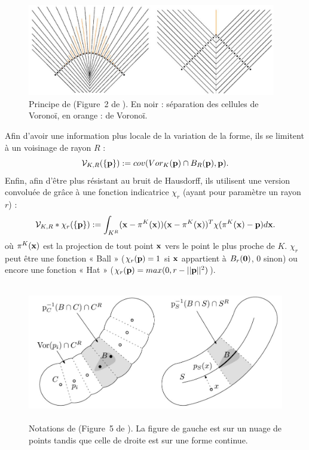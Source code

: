 \begin{figure}[ht]{
    \begin{center}
    \includegraphics[height=4cm]{images/Feature/VCM}
    \end{center}}
    \caption[Principe de \VCM.]{Principe de \VCM (Figure~2 de \cite{Merigot2011}). En noir : séparation des cellules de Voronoï, en orange :  de Voronoï.
      \label{fig:mellado-VCM}}
\end{figure}

Afin d'avoir une information plus locale de la variation de la forme, ils se
limitent à un voisinage de rayon $R$ :
%
\begin{equation}
  \mathcal{V}_{K,R}(\{\mathbf{p}\}) := cov(Vor_K(\mathbf{p}) \cap B_{R}(\mathbf{p}), \mathbf{p}) .
\end{equation}
%
Enfin, afin d'être plus résistant au bruit de Hausdorff, ils utilisent une
version convoluée de \VCM grâce à une fonction indicatrice $\chi_r$
(ayant pour paramètre un rayon $r$) :
%
\begin{equation}
  \mathcal{V}_{K,R} \ast \chi_r(\{\mathbf{p}\}) := \int_{K^R} (\mathbf{x} - \pi^K(\mathbf{x}))(\mathbf{x} - \pi^K(\mathbf{x}))^T \chi(\pi^K(\mathbf{x}) - \mathbf{p}) d\mathbf{x} .
\end{equation}
%
où $\pi^K(\mathbf{x})$ est la projection de tout point $\mathbf{x}$ vers le point le plus proche de
$K$. $\chi_r$ peut être une fonction « Ball » ($\chi_r(\mathbf{p}) = 1$ si $\mathbf{x}$
appartient à $B_{r}(\mathbf{0})$, $0$ sinon) ou encore une fonction « Hat »
($\chi_r(\mathbf{p}) = max(0, r - ||\mathbf{p}||^2)$).

\begin{figure}[ht]{
    \begin{center}
    \includegraphics[height=6cm]{images/Feature/VCM_notations}
    \end{center}}
    \caption[Notations de \VCM.]{Notations de \VCM (Figure~5 de \cite{Merigot2011}). La figure de gauche est sur un nuage de points tandis que celle de droite est sur une forme continue. \label{fig:VCM-multiscale}}
\end{figure}


